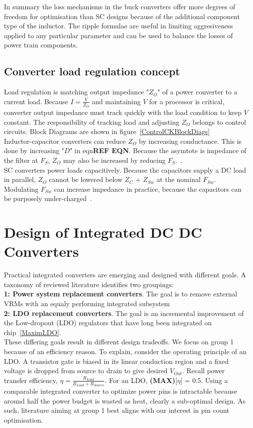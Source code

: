 \documentclass[letterpaper,twocolumn,10pt]{article}
\begin{document}
\indent In summary the loss mechanisms in the buck converters offer more degrees of freedom for optimisation than SC designs because of the additional component type of the inductor. The ripple formulae are useful in limiting aggresiveness applied to any particular parameter and can be used to balance the losses of power train components.

\subsection{Converter load regulation concept}
Load regulation is matching output impedance "$Z_O$" of a power converter to a current load. Because $I= \frac{V}{Z_O}$ and maintaining $V$ for a processor is critical, converter output impedance must track quickly with the load condition to keep $V$ constant. The responsibility of tracking load and adjusting $Z_O$ belongs to control circuits. Block Diagrams are shown in figure~\ref{ControlCKBlockDiags}\\
Inductor-capacitor converters can reduce $Z_O$ by increasing conductance. This is done by increasing "$D$" in eqn\textbf{REF EQN}. Because the asymtote is impedance of the filter at $F_S$, $Z_O$ may also be increased by reducing $F_S$.~\cite{Alghamdi2012}.\\ %
SC converters power loads capacitively. Because the capacitors supply a DC load in parallel, $Z_O$ cannot be lowered below $Z_C$ + $Z_{Sw}$ at the nominal $F_{Sw}$. Modulating $F_{Sw}$ can increase impedance in practice, because the capacitors can be purposely under-charged~\cite{Seeman2008}.\\

\section{Design of Integrated DC DC Converters}

Practical integrated converters are emerging and designed with different goals. A taxonomy of reviewed literature identifies two groupings:\\
\textbf{1: Power system replacement converters}. The goal is to remove external VRMs with an equaly performing integrated subsystem\\
\textbf{2: LDO replacement converters}. The goal is an incremental improvement of the Low-dropout (LDO) regulators that have long been integrated on chip~\ref{MaximLDO}.\\
These differing goals result in different design tradeoffs. We focus on group 1 because of an efficiency reason. To explain, consider the operating principle of an LDO. A transistor gate is biased in its linear conduction region and a fixed voltage is dropped from source to drain to give desired $V_{Out}$. Recall power transfer efficiency, $\eta = \frac{R_{Load}}{R_{Load} + R_{Source}}$. For an LDO, \textbf{(MAX)}[$\eta$] = 0.5. Using a comparable integrated converter to optimize power pins is intractable because around half the power budget is wasted as heat, clearly a sub-optimal design. As such, literature aiming at group 1 best aligns with our interest in pin count optimisation.\\  
\end{document}
